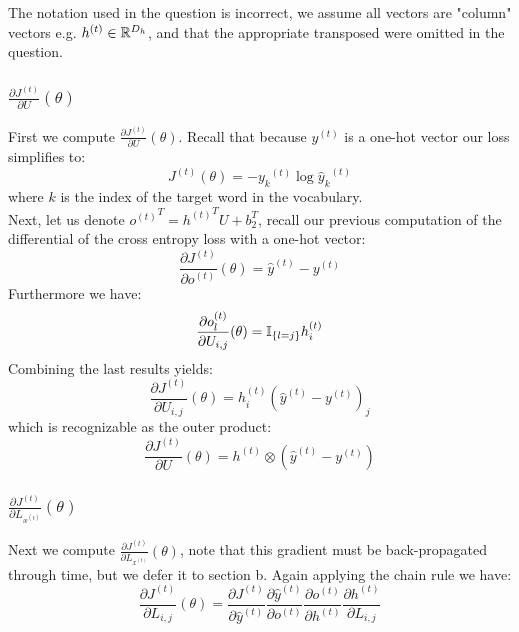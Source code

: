 The notation used in the question is incorrect, we assume all vectors are "column" vectors e.g. $h^{(t)} \in \mathbb{R}^{D_h}$, and that the appropriate transposed were omitted in the question.  

\subsubsection[short]{$\frac{\partial J^{(t)}}{\partial U}(\theta)$}
First we compute $\frac{\partial J^{(t)}}{\partial U}(\theta)$. 
Recall that because $y^{(t)}$ is a one-hot vector our loss simplifies to:
\begin{equation}
  J^{(t)}(\theta) = -{y_k}^{(t)} \log {\hat{y}_k}^{(t)}
\end{equation}
where $k$ is the index of the target word in the vocabulary.\\

Next, let us denote ${o^{(t)}}^T = {h^{(t)}}^T U + b_2^T$, recall our previous computation of the differential of the cross entropy loss with a one-hot vector:
\begin{equation} \label{eq:grad_o}
  \frac{\partial J^{(t)}}{\partial o^{(t)}}(\theta) = \hat{y}^{(t)} - y^{(t)}
\end{equation}
Furthermore we have:
\begin{equation}
  \frac{\partial o_l^{(t)}}{\partial U_{i,j}}(\theta) = \I{l=j} h^{(t)}_i
\end{equation}
Combining the last results yields:
\begin{equation}
  \frac{\partial J^{(t)}}{\partial U_{i,j}}(\theta) =  h^{(t)}_i (\hat{y}^{(t)} - y^{(t)})_j
\end{equation}
which is recognizable as the outer product:
\begin{equation}
  \boxed{ \frac{\partial J^{(t)}}{\partial U}(\theta) =  h^{(t)} \otimes (\hat{y}^{(t)} - y^{(t)}) } 
\end{equation}

\subsubsection[short]{$\frac{\partial J^{(t)}}{\partial L_{x^{(t)}}}(\theta)$}
Next we compute $\frac{\partial J^{(t)}}{\partial L_{x^{(t)}}}(\theta)$, note that this gradient must be back-propagated through time, but we defer it to section b. 
Again applying the chain rule we have:
\begin{equation} \label{eq:grad_L}
  \frac{\partial J^{(t)}}{\partial L_{i,j}}(\theta) = \frac{\partial J^{(t)}}{\partial \hat{y}^{(t)}} \frac{{\partial \hat{y}^{(t)}}}{\partial o^{(t)}} \frac{\partial o^{(t)}}{\partial h^{(t)}} \frac{\partial h^{(t)}}{\partial L_{i,j}} 
\end{equation}

